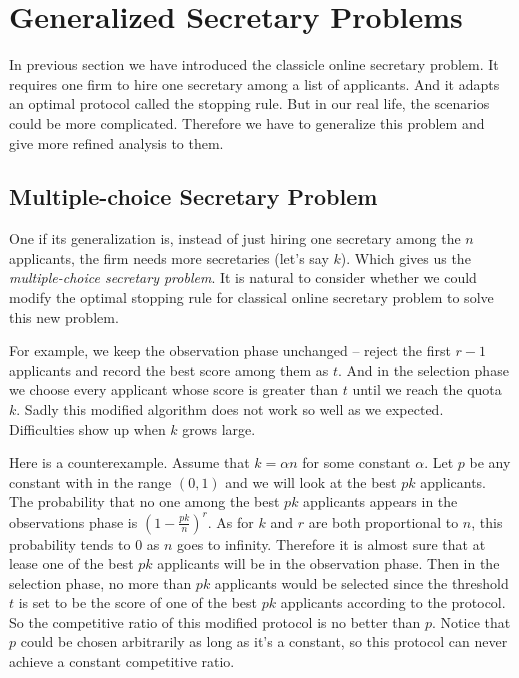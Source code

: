 \section{Generalized Secretary Problems}

In previous section we have introduced the classicle online secretary
problem. It requires one firm to hire one secretary among 
a list of applicants. And it adapts an optimal protocol called the
stopping rule. But in our real life, the scenarios could be more
complicated. Therefore we have to generalize this problem and give more
refined analysis to them.

\subsection{Multiple-choice Secretary Problem}
\label{multichoiceproblem}

One if its generalization is, instead of just hiring one secretary among
the $n$ applicants, the firm needs more secretaries (let's say $k$).
Which gives us the \emph{multiple-choice secretary problem}.
It is natural to consider whether we could modify the optimal stopping rule
for classical online secretary problem to solve this new problem.

For example, we keep the observation phase unchanged -- reject the first
$r - 1$ applicants and record the best score among them as $t$. And in
the selection phase we choose every applicant whose score is greater than 
$t$ until we reach the quota $k$. Sadly this modified algorithm does not
work so well as we expected. Difficulties show up when $k$ grows large.

Here is a counterexample. Assume that $k = \alpha n$ for some constant 
$\alpha$. Let $p$ be any constant with in the range $(0, 1)$ and 
we will look at the best $p k$ applicants. The probability that no one
among the best $p k$ applicants appears in the observations phase is
$(1 - \frac{p k}{n})^r$. As for $k$ and $r$ are both proportional to $n$,
this probability tends to 0 as $n$ goes to infinity. Therefore it is almost
sure that at lease one of the best $p k$ applicants will be in the
observation phase. Then in the selection phase, no more than $p k$
applicants would be selected since the threshold $t$ is set to be the score
of one of the best $p k$ applicants according to the protocol.
So the competitive ratio of this modified protocol is no better than $p$.
Notice that $p$ could be chosen arbitrarily as long as it's a constant, 
so this protocol can never achieve a constant competitive ratio.

